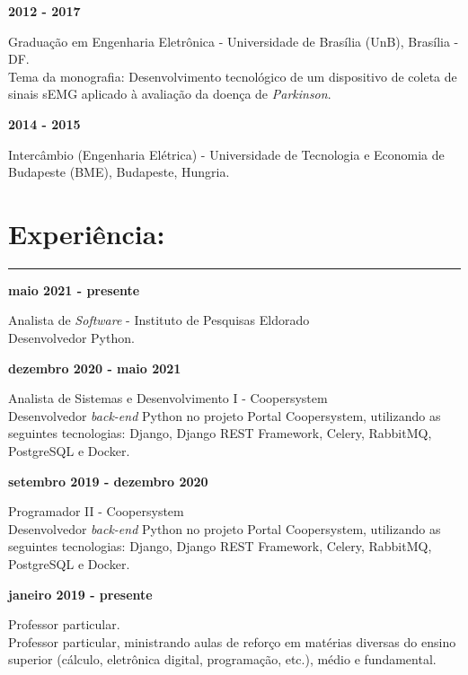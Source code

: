 \documentclass[11pt]{article}
\begin{document}
\textbf{2012 - 2017}
\begin{addmargin}{0.5cm}
Graduação em Engenharia Eletrônica - Universidade de Brasília (UnB), Brasília - DF. \\
Tema da monografia: Desenvolvimento tecnológico de um dispositivo de coleta
de sinais sEMG aplicado à avaliação da doença de \textit{Parkinson}.\\
\end{addmargin}

\textbf{2014 - 2015} 
\begin{addmargin}{0.5cm}
Intercâmbio (Engenharia Elétrica) - Universidade de Tecnologia e Economia de Budapeste (BME), Budapeste, Hungria. 
\end{addmargin}

\section{Experiência:}
\hrule \vspace{0.1cm}

\textbf{maio 2021 - presente}
\begin{addmargin}{0.5cm}
Analista de \textit{Software} - Instituto de Pesquisas Eldorado \\
Desenvolvedor Python.\\
\end{addmargin}

\textbf{dezembro 2020 - maio 2021}
\begin{addmargin}{0.5cm}
    Analista de Sistemas e Desenvolvimento I - Coopersystem \\
    Desenvolvedor \textit{back-end} Python no projeto Portal Coopersystem,
    utilizando as seguintes tecnologias: Django, Django REST Framework, Celery, 
    RabbitMQ, PostgreSQL e Docker.\\
\end{addmargin}


\newpage
\textbf{setembro 2019 - dezembro 2020}
\begin{addmargin}{0.5cm}
Programador II - Coopersystem \\
Desenvolvedor \textit{back-end} Python no projeto Portal Coopersystem,
utilizando as seguintes tecnologias: Django, Django REST Framework, Celery, 
RabbitMQ, PostgreSQL e Docker.\\
\end{addmargin}

\textbf{janeiro 2019 - presente}
\begin{addmargin}{0.5cm}
Professor particular. \\
Professor particular, ministrando aulas de reforço em matérias diversas
do ensino superior (cálculo, eletrônica digital, programação, etc.), médio
e fundamental.\\
\end{addmargin}
\end{document}
